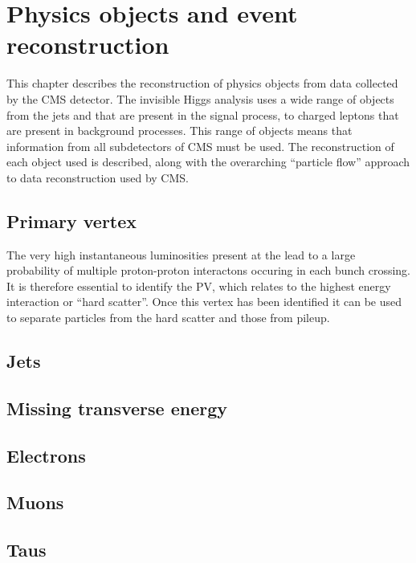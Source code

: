 \chapter{Physics objects and event reconstruction}
\label{chap:obj}
This chapter describes the reconstruction of physics objects from data collected by the CMS detector. The invisible Higgs analysis uses a wide range of objects from the jets and \MET that are present in the signal process, to charged leptons that are present in background processes. This range of objects means that information from all subdetectors of CMS must be used. The reconstruction of each object used is described, along with the overarching ``particle flow'' approach to data reconstruction used by CMS.


\section{Primary vertex}
\label{sec:PV}
The very high instantaneous luminosities present at the \LHC lead to a large probability of multiple proton-proton interactons occuring in each bunch crossing. It is therefore essential to identify the \ac{PV}, which relates to the highest energy interaction or ``hard scatter''. Once this vertex has been identified it can be used to separate particles from the hard scatter and those from pileup. %



\section{Jets}
\label{sec:jets}


\section{Missing transverse energy}
\label{sec:MET}

\section{Electrons}
\label{sec:electrons}

\section{Muons}
\label{sec:muons}

\section{Taus}
\label{sec:taus}
